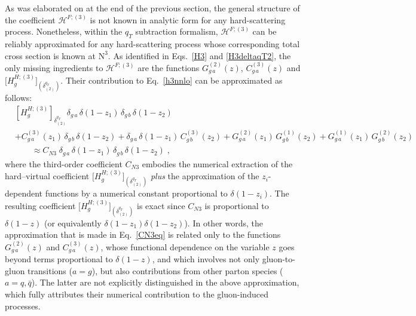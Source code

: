 \documentclass[12pt]{article}
\DeclareRobustCommand{\nn}{\nonumber}
\DeclareRobustCommand{\qt}{\ensuremath{q_T}\xspace}
\DeclareRobustCommand{\cH}{\ensuremath{\mathcal{H}}}
\DeclareRobustCommand{\LO}{\text{LO}\xspace}
\DeclareRobustCommand{\N}[1]{\ensuremath{\text{N}^{#1}}} %
\begin{document}
As was elaborated on at the end of the previous section, the general structure of the coefficient $\cH^{F;(3)}$ is not known in analytic form for any hard-scattering process. Nonetheless, within the $\qt$ subtraction  formalism, $\cH^{F;(3)}$ can be reliably approximated for any hard-scattering process whose corresponding total cross section is known at \N3\LO. 
As identified in Eqs.~\eqref{H3} and \eqref{H3deltaqT2}, the only missing ingredients to $\cH^{F;(3)}$ are the functions $G^{(2)}_{g\,a}(z)$, $C^{(3)}_{g\,a}(z)$ and $ \bigl[H^{H;(3)}_{g}\bigr]_{(\delta^{\qt}_{(2)})}$. 
Their contribution to Eq.~\eqref{h3nnlo} can be approximated as follows:
\begin{align}
  &
  \left[ H_g^{H;(3)} \right]_{\delta^{\qt}_{(2)}} 
  \delta_{g\,a} \, \delta(1-z_1) \, \delta_{g\,b} \, \delta(1-z_2) 
  \nn\\&
  + C^{(3)}_{g\,a}(z_1) \, \delta_{g\,b} \, \delta(1-z_2) 
  + \delta_{g\,a} \, \delta(1-z_1) \, C^{(3)}_{g\,b}(z_2) 
  + G^{(2)}_{g\,a}(z_1) \, G^{(1)}_{g\,b}(z_2) 
  + G^{(1)}_{g\,a}(z_1) \, G^{(2)}_{g\,b}(z_2) 
  \nn\\&\qquad\approx
  C_{N3} \; \delta_{g\,a} \, \delta(1-z_1) \, \delta_{g\,b} \, \delta(1-z_2) \;,
  \label{CN3eq}
\end{align}
where the third-order coefficient $C_{N3}$ embodies the numerical extraction of the hard--virtual coefficient $\big[H^{H;(3)}_{g}\big]_{(\delta^{\qt}_{(2)})}$  \textit{plus} the approximation of the $z_i$-dependent functions by a numerical constant proportional to $\delta(1-z_i)$. The resulting coefficient $\big[H^{H;(3)}_{g}\big]_{(\delta^{\qt}_{(2)})}$ is exact since $C_{N3}$ is proportional to $\delta(1-z)$ (or equivalently $\delta(1-z_1)\delta(1-z_2)$). In other words, the approximation that is made in Eq.~\eqref{CN3eq} is related only to the functions $G^{(2)}_{g\,a}(z)$ and $C^{(3)}_{g\,a}(z)
$, whose functional dependence on the variable $z$ goes beyond terms proportional to $\delta(1-z)$, and which involves not only gluon-to-gluon transitions ($a=g$), but also contributions from 
other parton species ($a=q,\bar q$). The latter are not explicitly distinguished in the above approximation, which fully attributes their numerical contribution to the gluon-induced processes. 
\end{document}

